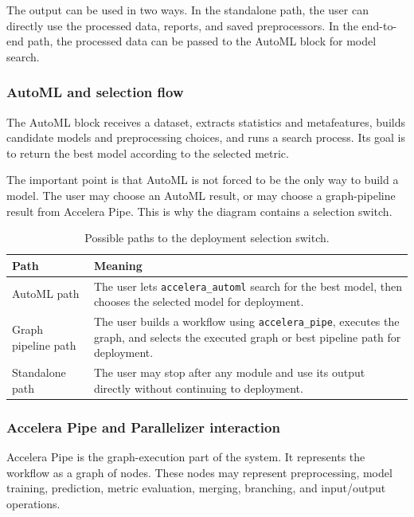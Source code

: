 \documentclass[12pt,a4paper]{report}
\begin{document}
The output can be used in two ways. In the standalone path, the user can directly
use the processed data, reports, and saved preprocessors. In the end-to-end path,
the processed data can be passed to the AutoML block for model search.

\subsubsection*{AutoML and selection flow}

The AutoML block receives a dataset, extracts statistics and metafeatures, builds
candidate models and preprocessing choices, and runs a search process. Its goal
is to return the best model according to the selected metric.

The important point is that AutoML is not forced to be the only way to build a
model. The user may choose an AutoML result, or may choose a graph-pipeline
result from Accelera Pipe. This is why the diagram contains a selection switch.

\begin{table}[!htbp]
\centering
\caption{Possible paths to the deployment selection switch.}
\label{tab:selection-switch-paths}
\small
\renewcommand{\arraystretch}{1.15}
\setlength{\tabcolsep}{4pt}
\begin{tabularx}{\textwidth}{p{}X}
\toprule
Path & Meaning \\
\midrule
AutoML path &
The user lets \texttt{accelera\_automl} search for the best model, then chooses
the selected model for deployment. \\

Graph pipeline path &
The user builds a workflow using \texttt{accelera\_pipe}, executes the graph,
and selects the executed graph or best pipeline path for deployment. \\

Standalone path &
The user may stop after any module and use its output directly without
continuing to deployment. \\
\bottomrule
\end{tabularx}
\renewcommand{\arraystretch}{1.0}
\end{table}

\subsubsection*{Accelera Pipe and Parallelizer interaction}

Accelera Pipe is the graph-execution part of the system. It represents the
workflow as a graph of nodes. These nodes may represent preprocessing, model
training, prediction, metric evaluation, merging, branching, and input/output
operations.
\end{document}
